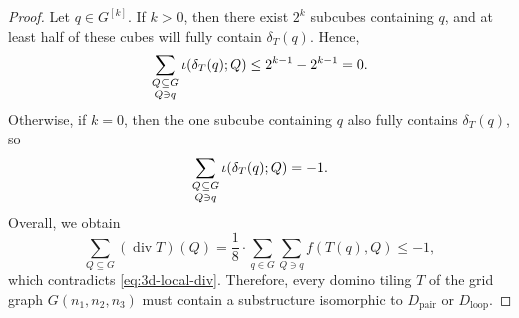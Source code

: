 \begin{proof}
  Let $q \in G^{[k]}$. 
  If $k > 0$, then there exist $2^k$ subcubes containing $q$, and at least half of these cubes will fully contain $\delta_T(q)$.
  Hence,
  \begin{equation}
    \sum_{\substack{Q \mskip 1mu \subseteq \mskip 0.3mu G \\[0.2ex] Q \ni q}} \iota(\delta_T(q); Q) \leq 2^{k-1} - 2^{k-1} = 0.
  \end{equation}
  Otherwise, if $k = 0$, then the one subcube containing $q$ also fully contains $\delta_T(q)$, so 
  \begin{equation}
    \sum_{\substack{Q \mskip 1mu \subseteq \mskip 0.3mu G \\[0.2ex] Q \ni q}} \iota(\delta_T(q); Q) = -1.
  \end{equation}
  Overall, we obtain
  \begin{equation}
    \sum_{Q \subseteq G} (\operatorname{div} T)(Q) =
    \frac{1}{8} \cdot \sum_{q \in G} \sum_{Q \ni q} f(T(q), Q) 
    \leq -1,
  \end{equation}
  which contradicts \eqref{eq:3d-local-div}. 
  Therefore, every domino tiling $T$ of the grid graph $G(n_1, n_2, n_3)$ must contain a substructure isomorphic to $D_{\mathrm{pair}}$ or $D_{\mathrm{loop}}$.
\end{proof}